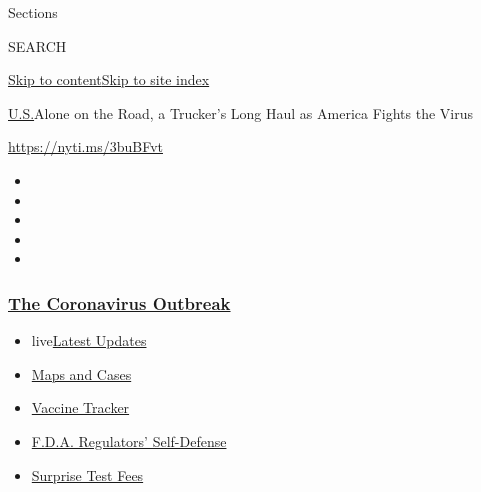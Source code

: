 Sections

SEARCH

\protect\hyperlink{site-content}{Skip to
content}\protect\hyperlink{site-index}{Skip to site index}

\href{/section/us}{U.S.}\textbar{}Alone on the Road, a Trucker's Long
Haul as America Fights the Virus

\url{https://nyti.ms/3buBFvt}

\begin{itemize}
\item
\item
\item
\item
\item
\end{itemize}

\hypertarget{the-coronavirus-outbreak}{%
\subsubsection{\texorpdfstring{\href{https://www.nytimes3xbfgragh.onion/news-event/coronavirus?name=styln-coronavirus-national\&region=TOP_BANNER\&block=storyline_menu_recirc\&action=click\&pgtype=Article\&impression_id=1eb6d220-f52e-11ea-bbd6-6f8cd97bf3d0\&variant=undefined}{The
Coronavirus
Outbreak}}{The Coronavirus Outbreak}}\label{the-coronavirus-outbreak}}

\begin{itemize}
\tightlist
\item
  live\href{https://www.nytimes3xbfgragh.onion/2020/09/12/world/covid-19-coronavirus.html?name=styln-coronavirus-national\&region=TOP_BANNER\&block=storyline_menu_recirc\&action=click\&pgtype=Article\&impression_id=1eb6d221-f52e-11ea-bbd6-6f8cd97bf3d0\&variant=undefined}{Latest
  Updates}
\item
  \href{https://www.nytimes3xbfgragh.onion/interactive/2020/us/coronavirus-us-cases.html?name=styln-coronavirus-national\&region=TOP_BANNER\&block=storyline_menu_recirc\&action=click\&pgtype=Article\&impression_id=1eb6f930-f52e-11ea-bbd6-6f8cd97bf3d0\&variant=undefined}{Maps
  and Cases}
\item
  \href{https://www.nytimes3xbfgragh.onion/interactive/2020/science/coronavirus-vaccine-tracker.html?name=styln-coronavirus-national\&region=TOP_BANNER\&block=storyline_menu_recirc\&action=click\&pgtype=Article\&impression_id=1eb6f931-f52e-11ea-bbd6-6f8cd97bf3d0\&variant=undefined}{Vaccine
  Tracker}
\item
  \href{https://www.nytimes3xbfgragh.onion/2020/09/10/us/politics/fda-coronavirus-vaccine.html?name=styln-coronavirus-national\&region=TOP_BANNER\&block=storyline_menu_recirc\&action=click\&pgtype=Article\&impression_id=1eb6f932-f52e-11ea-bbd6-6f8cd97bf3d0\&variant=undefined}{F.D.A.
  Regulators' Self-Defense}
\item
  \href{https://www.nytimes3xbfgragh.onion/2020/09/09/upshot/coronavirus-surprise-test-fees.html?name=styln-coronavirus-national\&region=TOP_BANNER\&block=storyline_menu_recirc\&action=click\&pgtype=Article\&impression_id=1eb6f933-f52e-11ea-bbd6-6f8cd97bf3d0\&variant=undefined}{Surprise
  Test Fees}
\end{itemize}

